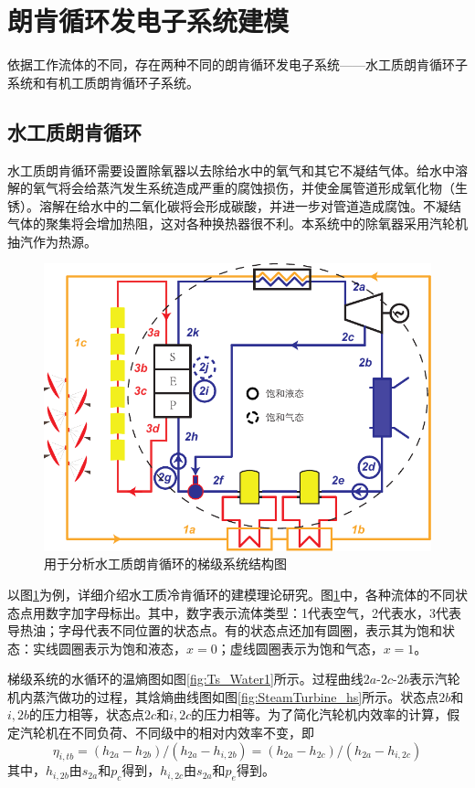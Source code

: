\section{朗肯循环发电子系统建模}
依据工作流体的不同，存在两种不同的朗肯循环发电子系统——水工质朗肯循环子系统和有机工质朗肯循环子系统。

\subsection{水工质朗肯循环}
  
  水工质朗肯循环需要设置除氧器以去除给水中的氧气和其它不凝结气体。给水中溶解的氧气将会给蒸汽发生系统造成严重的腐蚀损伤，并使金属管道形成氧化物（生锈）。溶解在给水中的二氧化碳将会形成碳酸，并进一步对管道造成腐蚀。不凝结气体的聚集将会增加热阻，这对各种换热器很不利。本系统中的除氧器采用汽轮机抽汽作为热源。
  
\begin{figure}[!ht]
\begin{center}
	\includegraphics[width = 0.8\columnwidth]{fig/SRCinCS}
	\caption{用于分析水工质朗肯循环的梯级系统结构图}
	\label{fig:SRCinCS}
\end{center}
\end{figure}
  
  以图\ref{fig:SRCinCS}为例，详细介绍水工质冷肯循环的建模理论研究。图\ref{fig:SRCinCS}中，各种流体的不同状态点用数字加字母标出。其中，数字表示流体类型：1代表空气，2代表水，3代表导热油；字母代表不同位置的状态点。有的状态点还加有圆圈，表示其为饱和状态：实线圆圈表示为饱和液态，$x = 0$；虚线圆圈表示为饱和气态，$x = 1$。

梯级系统的水循环的温熵图如图\ref{fig:Ts_Water1}所示。过程曲线$2a$-$2c$-$2b$表示汽轮机内蒸汽做功的过程，其焓熵曲线图如图\ref{fig:SteamTurbine_hs}所示。状态点$2b$和$i,2b$的压力相等，状态点$2c$和$i,2c$的压力相等。为了简化汽轮机内效率的计算，假定汽轮机在不同负荷、不同级中的相对内效率不变，即
\begin{equation}
      \eta_{i,tb} =(h_{2a}-h_{2b})/(h_{2a}-h_{i,2b}) = (h_{2a}-h_{2c})/(h_{2a}-h_{i,2c})
\end{equation}
其中，$h_{i,2b}$由$s_{2a}$和$p_c$得到，$h_{i,2c}$由$s_{2a}$和$p_e$得到。


